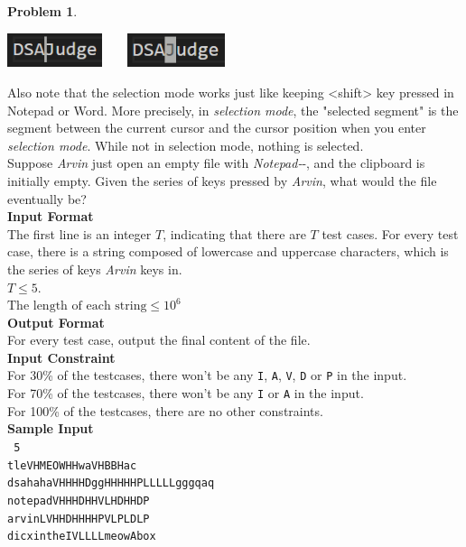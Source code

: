 \documentclass[12pt,a4paper]{report}
\theoremstyle{definition}
\newtheorem{problem}{\textbf{Problem}}
\theoremstyle{definition}
\begin{document}
\begin{problem}
\begin{center}
\includegraphics[height=1cm]{cursor1}\ \ \ \ 
\includegraphics[height=1cm]{cursor2}
\end{center}

Also note that the selection mode works just like keeping <shift> key pressed in Notepad or Word. More precisely, in \textit{selection mode}, the "selected segment" is the segment between the current cursor and the cursor position when you enter \textit{selection mode}. While not in selection mode, nothing is selected.\\
Suppose \textit{Arvin} just open an empty file with \textit{Notepad-}-, and the clipboard is initially empty. Given the series of keys pressed by \textit{Arvin}, what would the file eventually be?\\

\textbf{\large Input Format}\\
The first line is an integer $T$, indicating that there are $T$ test cases. For every test case, there is a string composed of lowercase and uppercase characters, which is the series of keys \textit{Arvin} keys in.\\
    $T \leq 5$.\\
    $\text{The length of each string}\leq 10^6$\\

\textbf{\large Output Format}\\
For every test case, output the final content of the file.\\

\textbf{\large Input Constraint}\\
    For 30\% of the testcases, there won't be any \texttt{I}, \texttt{A}, \texttt{V}, \texttt{D} or \texttt{P} in the input.\\
    For 70\% of the testcases, there won't be any \texttt{I} or \texttt{A} in the input.\\
    For 100\% of the testcases, there are no other constraints.\\


\textbf{\large Sample Input}\\
\texttt{
    5\\
    tleVHMEOWHHwaVHBBHac\\
    dsahahaVHHHHDggHHHHHPLLLLLgggqaq\\
    notepadVHHHDHHVLHDHHDP\\
    arvinLVHHDHHHHPVLPLDLP\\
    dicxintheIVLLLLmeowAbox\\
}


\end{problem}
\end{document}
